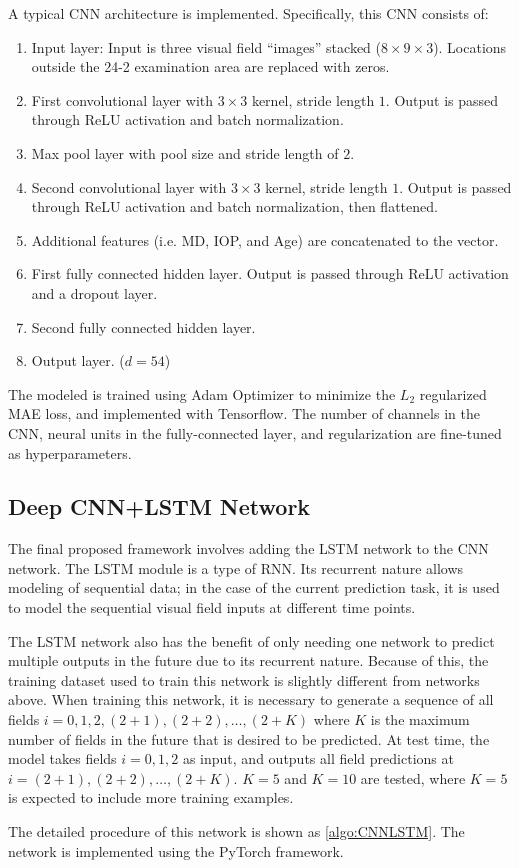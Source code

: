 A typical \ac{CNN} architecture is implemented. Specifically, this \ac{CNN} consists of:

\begin{enumerate}
\item Input layer: Input is three visual field ``images'' stacked ($8\times9\times3$). Locations outside the 24-2 examination area are replaced with zeros. 
\item First convolutional layer with $3\times3$ kernel, stride length $1$. Output is passed through ReLU activation and batch normalization. 
\item Max pool layer with pool size and stride length of $2$. 
\item Second convolutional layer with $3\times3$ kernel, stride length $1$. Output is passed through ReLU activation and batch normalization, then flattened. 
\item Additional features (i.e. MD, IOP, and Age) are concatenated to the vector. 
\item First fully connected hidden layer. Output is passed through ReLU activation and a dropout layer. 
\item Second fully connected hidden layer. 
\item Output layer. ($d=54$)
\end{enumerate}

The modeled is trained using Adam Optimizer to minimize the $L_2$ regularized \ac{MAE} loss, and implemented with Tensorflow. \cite{tensorflow} The number of channels in the \ac{CNN}, neural units in the fully-connected layer, and regularization are fine-tuned as hyperparameters. 

\subsection{Deep CNN+LSTM Network}

The final proposed framework involves adding the \ac{LSTM} network to the \ac{CNN} network. The \ac{LSTM} module is a type of \ac{RNN}. Its recurrent nature allows modeling of sequential data; in the case of the current prediction task, it is used to model the sequential visual field inputs at different time points. 

The \ac{LSTM} network also has the benefit of only needing one network to predict multiple outputs in the future due to its recurrent nature. Because of this, the training dataset used to train this network is slightly different from networks above. When training this network, it is necessary to generate a sequence of all fields $i=0, 1, 2, (2+1), (2+2), \dots, (2+K)$ where $K$ is the maximum number of fields in the future that is desired to be predicted. At test time, the model takes fields $i=0, 1, 2$ as input, and outputs all field predictions at $i=(2+1), (2+2), \dots, (2+K)$. $K=5$ and $K=10$ are tested, where $K=5$ is expected to include more training examples. 

The detailed procedure of this network is shown as \cref{algo:CNNLSTM}. The network is implemented using the PyTorch framework. \cite{paszke2017automatic} 














